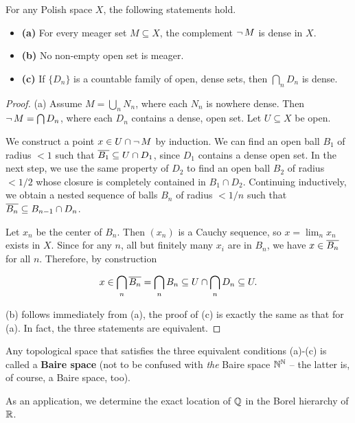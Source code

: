 \begin{theorem}\label{thm-baire-category}For any Polish space $X$, the following statements hold.

\begin{itemize}
\item \textbf{(a)} For every meager set $M \subseteq X$, the complement $\neg \, M$ is dense in $X$.
\item \textbf{(b)} No non-empty open set is meager.
\item \textbf{(c)} If $\{D_n\}$ is a countable family of open, dense sets, then  $\bigcap_{n} D_n$ is dense.
\end{itemize}

\end{theorem}\begin{proof}(a) Assume  $M = \bigcup_n N_n$, where each $N_n$ is nowhere dense. Then $\neg \, M = \bigcap D_n$, where each $D_n$ contains a dense, open set. Let $U \subseteq X$ be open.

We construct a point $x \in U \cap \neg \, M$ by induction. We can find an open ball $B_1$ of radius $<1$ such that $\overline{B_1} \subseteq U \cap D_1$, since $D_1$ contains a dense open set. In the next step, we use the same property of $D_2$ to find an open ball $B_2$ of radius $<1/2$ whose closure is completely contained in $B_1 \cap D_2$.
Continuing inductively, we obtain a  nested sequence of balls $B_n$ of radius $<1/n$ such that $\overline{B_n} \subseteq B_{n -1} \cap D_n$.

Let $x_n$ be the center of $B_n$. Then $(x_n)$ is a Cauchy sequence, so $x = \lim_n x_n$ exists in $X$. Since for any $n$, all but finitely many $x_i$ are in $B_n$, we have $x \in \overline{B_n}$ for all $n$. Therefore, by construction

\begin{equation}
x \in \bigcap_n \overline{B_n} = \bigcap_n B_n \subseteq U \cap \bigcap_n D_n \subseteq U.
\end{equation}

(b) follows immediately from (a), the proof of (c) is exactly the same as that for (a). In fact, the three statements are equivalent.

\end{proof}Any topological space that satisfies the three equivalent conditions (a)-(c) is called a \textbf{Baire space} (not to be confused with \textit{the} Baire space $\mathbb{N}^{\mathbb{N}}$ -- the latter is, of course, a Baire space, too).

As an application, we determine the exact location of $\mathbb{Q}$ in the Borel hierarchy of $\mathbb{R}$.

